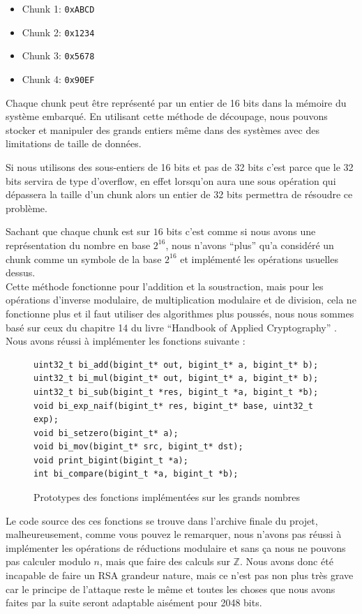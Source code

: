 \begin{itemize}
\item Chunk 1: \texttt{0xABCD}
\item Chunk 2: \texttt{0x1234}
\item Chunk 3: \texttt{0x5678}
\item Chunk 4: \texttt{0x90EF}
\end{itemize}

Chaque chunk peut être représenté par un entier de 16 bits dans la mémoire du système embarqué. En utilisant cette méthode de découpage, nous pouvons stocker et manipuler des grands entiers même dans des systèmes avec des limitations de taille de données.

Si nous utilisons des sous-entiers de 16 bits et pas de 32 bits c'est parce que le 32 bits servira de type d'overflow, en effet lorsqu'on aura une sous opération qui dépassera la taille d'un chunk alors un entier de 32 bits permettra de résoudre ce problème.

Sachant que chaque chunk est sur $16$ bits c'est comme si nous avons une représentation du nombre en base $2^{16}$, nous n'avons ``plus'' qu'a considéré un chunk comme un symbole de la base $2^{16}$ et implémenté les opérations usuelles dessus.\\

Cette méthode fonctionne pour l'addition et la soustraction, mais pour les opérations d'inverse modulaire, de multiplication modulaire et de division, cela ne fonctionne plus et il faut utiliser des algorithmes plus poussés, nous nous sommes basé sur ceux du chapitre 14 du livre ``Handbook of Applied Cryptography'' \cite{hac:ch14}. Nous avons réussi à implémenter les fonctions suivante :
\begin{figure}[H]
\begin{verbatim}
uint32_t bi_add(bigint_t* out, bigint_t* a, bigint_t* b);
uint32_t bi_mul(bigint_t* out, bigint_t* a, bigint_t* b);
uint32_t bi_sub(bigint_t *res, bigint_t *a, bigint_t *b);
void bi_exp_naif(bigint_t* res, bigint_t* base, uint32_t exp);
void bi_setzero(bigint_t* a);
void bi_mov(bigint_t* src, bigint_t* dst);
void print_bigint(bigint_t *a);
int bi_compare(bigint_t *a, bigint_t *b);
\end{verbatim}
\caption{Prototypes des fonctions implémentées sur les grands nombres}
\label{fig:proto_fn}
\end{figure}

Le code source des ces fonctions se trouve dans l'archive finale du projet, malheureusement, comme vous pouvez le remarquer, nous n'avons pas réussi à implémenter les opérations de réductions modulaire et sans ça nous ne pouvons pas calculer modulo $n$, mais que faire des calculs sur $\mathbb{Z}$. Nous avons donc été incapable de faire un RSA grandeur nature, mais ce n'est pas non plus très grave car le principe de l'attaque reste le même et toutes les choses que nous avons faites par la suite seront adaptable aisément pour 2048 bits.

